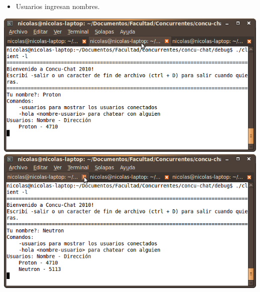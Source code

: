 \begin{itemize}
  \item Usuarios ingresan nombres.
\end{itemize}
\begin{center}
  \small\includegraphics[scale=0.65]{./Images/Conver1}
  \small\includegraphics[scale=0.65]{./Images/Conver2}
\end{center}

